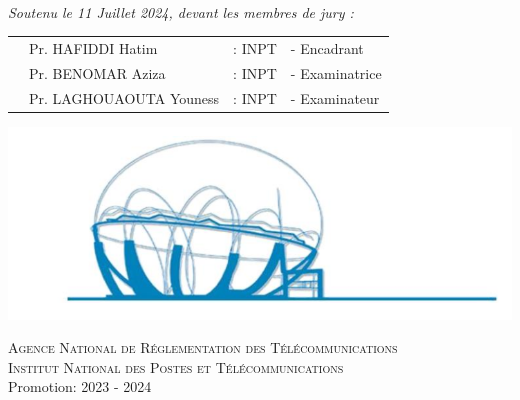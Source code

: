 \begin{titlepage}
\begin{minipage}{0.9\textwidth}
\begin{flushleft}
  \end{flushleft}
\end{minipage}

\begin{minipage}{0.4\textwidth}
\end{minipage}\\[0.2cm]
{\large \textit{Soutenu le 11 Juillet 2024, devant les membres de jury : }}\\[0.5cm]
\centering

\begin{tabular}{p{2.8cm}lll}
    & \large Pr. HAFIDDI Hatim & \large : INPT & \large -  Encadrant \\[0.1cm]
    & \large Pr. BENOMAR Aziza  & \large : INPT & \large -  Examinatrice  \\[0.1cm]
    & \large Pr. LAGHOUAOUTA Youness & \large : INPT & \large -  Examinateur \\[0.1cm]
 
\end{tabular}




\includegraphics[scale=0.8]{Images/ZLAFA.png}


\textsc{Agence National de Réglementation des Télécommunications}\\
\textsc{Institut National des Postes et Télécommunications}\\
\vspace{0.5cm}
{\large Promotion: 2023 - 2024}

\end{titlepage}